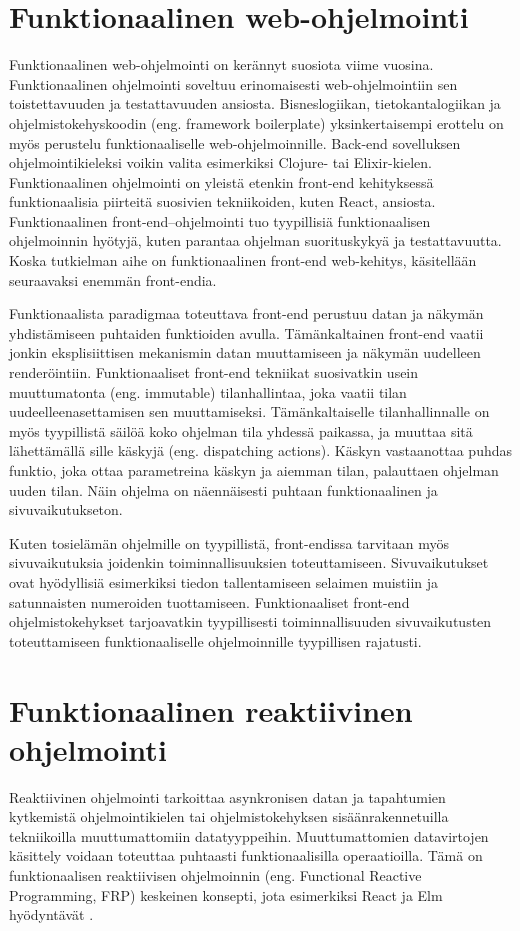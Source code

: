 \section{Funktionaalinen web-ohjelmointi}
Funktionaalinen web-ohjelmointi on kerännyt suosiota viime vuosina. Funktionaalinen ohjelmointi soveltuu erinomaisesti
web-ohjelmointiin sen toistettavuuden ja testattavuuden ansiosta. Bisneslogiikan, tietokantalogiikan ja
ohjelmistokehyskoodin (eng. framework boilerplate) yksinkertaisempi erottelu on myös perustelu funktionaaliselle
web-ohjelmoinnille. Back-end sovelluksen ohjelmointikieleksi voikin valita esimerkiksi Clojure- tai Elixir-kielen.
\cite{functionalwebdev} Funktionaalinen ohjelmointi on yleistä etenkin front-end kehityksessä funktionaalisia piirteitä
suosivien tekniikoiden, kuten React, ansiosta. Funktionaalinen front-end–ohjelmointi tuo tyypillisiä funktionaalisen
ohjelmoinnin hyötyjä, kuten parantaa ohjelman suorituskykyä ja testattavuutta. \cite{functionalreact} Koska tutkielman
aihe on funktionaalinen front-end web-kehitys, käsitellään seuraavaksi enemmän front-endia.

Funktionaalista paradigmaa toteuttava front-end perustuu datan ja näkymän yhdistämiseen puhtaiden funktioiden avulla.
Tämänkaltainen front-end vaatii jonkin eksplisiittisen mekanismin datan muuttamiseen ja näkymän uudelleen renderöintiin.
Funktionaaliset front-end tekniikat suosivatkin usein muuttumatonta (eng. immutable) tilanhallintaa, joka vaatii tilan
uudeelleenasettamisen sen muuttamiseksi. Tämänkaltaiselle tilanhallinnalle on myös tyypillistä säilöä koko ohjelman tila
yhdessä paikassa, ja muuttaa sitä lähettämällä sille käskyjä (eng. dispatching actions). Käskyn vastaanottaa puhdas
funktio, joka ottaa parametreina käskyn ja aiemman tilan, palauttaen ohjelman uuden tilan. Näin ohjelma on näennäisesti
puhtaan funktionaalinen ja sivuvaikutukseton. \cite{functionalreact}

Kuten tosielämän ohjelmille on tyypillistä, front-endissa tarvitaan myös sivuvaikutuksia joidenkin toiminnallisuuksien
toteuttamiseen. Sivuvaikutukset ovat hyödyllisiä esimerkiksi tiedon tallentamiseen selaimen muistiin ja satunnaisten
numeroiden tuottamiseen. Funktionaaliset front-end ohjelmistokehykset tarjoavatkin tyypillisesti toiminnallisuuden
sivuvaikutusten toteuttamiseen funktionaaliselle ohjelmoinnille tyypillisen rajatusti. \cite{elmlang}\cite{reactjs}

\section{Funktionaalinen reaktiivinen ohjelmointi}
Reaktiivinen ohjelmointi tarkoittaa asynkronisen datan ja tapahtumien kytkemistä ohjelmointikielen tai
ohjelmistokehyksen sisäänrakennetuilla tekniikoilla muuttumattomiin datatyyppeihin. Muuttumattomien datavirtojen 
käsittely voidaan toteuttaa puhtaasti funktionaalisilla operaatioilla. Tämä on funktionaalisen reaktiivisen ohjelmoinnin
(eng. Functional Reactive Programming, FRP) keskeinen konsepti, jota esimerkiksi React ja Elm hyödyntävät
\cite{elmlang}\cite{reactjs}. \cite{fpmattered}

